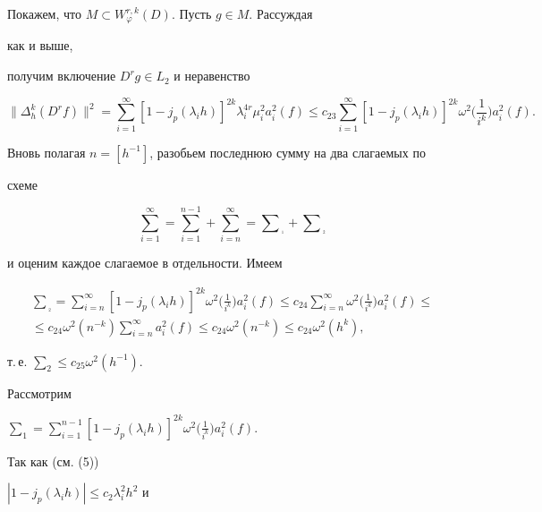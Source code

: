 \begin{pf}
\begin{equation}
\end{equation} 


Покажем, что $M\subset W^{r,k}_\varphi(D)$. Пусть $g\in M$. Рассуждая


как и выше, 


получим включение $D^r g\in L_2$ и неравенство 


$$ 


\|\Delta^k_h(D^r f)\|^2=\sum^\infty_{i=1}[1-j_p(\lambda_i h)]^{2k} 


\lambda^{4r}_i\mu^2_i a^2_i(f)\le c_{23}\sum^\infty_{i=1} 


[1-j_p(\lambda_i h)]^{2k}\omega^2\bigg(\frac{1}{i^k}\bigg) 


a^2_i(f). 


$$ 


Вновь полагая $n=[h^{-1}]$, разобьем последнюю сумму на два слагаемых по 


схеме 


$$ 


\sum^\infty_{i=1}=\sum^{n-1}_{i=1}+\sum^\infty_{i=n}= 


\sum{}_{{}_{{}_1}}+\sum{}_{{}_{{}_2}} 


$$ 


и оценим каждое слагаемое в отдельности. Имеем 


\begin{multline*} 


\sum{}_{{}_{{}_2}}=\sum^\infty_{i=n}[1-j_p(\lambda_i h)]^{2k}\omega^2 


\bigg(\frac{1}{i^k}\bigg)a^2_i(f)\le c_{24}\sum^\infty_{i=n} 


\omega^2\bigg(\frac{1}{i^k}\bigg)a^2_i(f)\le \\ 


% 


\le c_{24}\omega^2(n^{-k})\sum^\infty_{i=n}a^2_i(f)\le 


c_{24}\omega^2(n^{-k})\le c_{24}\omega^2(h^k), 


\end{multline*} 


т.\,е. $\sum_2\le c_{25}\omega^2(h^{-1})$. 


Рассмотрим


$\sum_1=\sum\limits^{n-1}_{i=1}[1-j_p(\lambda_i 


h)]^{2k}\omega^2\big(\frac{1}{i^k}\big)a^2_i(f)$. 


Так как (см. (5)) \linebreak


$|1-j_p(\lambda_i h)|\le c_2\lambda^2_i h^2$ и 



\end{pf}
